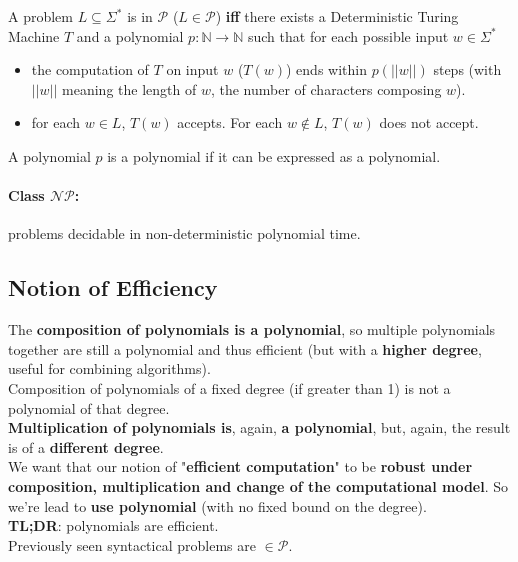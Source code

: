\documentclass[11pt]{article}
\begin{document}
	A problem $L \subseteq \Sigma^\ast$ is in $\mathcal{P}$ ($L \in \mathcal{P}$) \textbf{iff} there exists a Deterministic Turing Machine $T$ and a polynomial $p: \mathbb{N} \rightarrow \mathbb{N}$ such that for each possible input $w \in \Sigma^\ast$ 
	\begin{itemize}
		\item the computation of $T$ on input $w$ ($T(w)$) ends within $p(||w||)$ steps (with $||w||$ meaning the length of $w$, the number of characters composing $w$).
		\item for each $w \in L$, $T(w)$ accepts. For each $w \notin L$, $T(w)$ does not accept.
	\end{itemize}
	
	A polynomial $p$ is a polynomial if it can be expressed as a polynomial.\\
	
	\paragraph{Class $\mathcal{NP}$:} problems decidable in non-deterministic polynomial time.\\
	
	\newpage
	
	\subsection{Notion of Efficiency}
	
	The \textbf{composition of polynomials is a polynomial}, so multiple polynomials together are still a polynomial and thus efficient (but with a \textbf{higher degree}, useful for combining algorithms).\\
	Composition of polynomials of a fixed degree (if greater than 1) is not a polynomial of that degree.\\
	
	\textbf{Multiplication of polynomials is}, again, \textbf{a polynomial}, but, again, the result is of a \textbf{different degree}.\\
	
	We want that our notion of "\textbf{efficient computation}" to be \textbf{robust under composition, multiplication and change of the computational model}. So we're lead to \textbf{use polynomial} (with no fixed bound on the degree).\\
	
	\textbf{TL;DR}: polynomials are efficient.\\
	
	Previously seen syntactical problems are $\in \mathcal{P}$.\\
	
	
\end{document}
